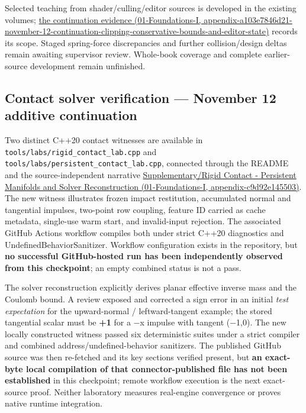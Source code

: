 Selected teaching from shader/culling/editor sources is developed in the existing volumes; \href{../01-Foundations-I/main.pdf\#nameddest=appendix-a103e7846d21-november-12-continuation-clipping-conservative-bounds-and-editor-state}{the continuation evidence (01-Foundations-I, appendix-a103e7846d21-november-12-continuation-clipping-conservative-bounds-and-editor-state)} records its scope. Staged spring-force discrepancies and further collision/design deltas remain awaiting supervisor review. Whole-book coverage and complete earlier-source development remain unfinished.

\subsection{Contact solver verification --- November 12 additive continuation}\label{appendix-3b67654799a2-contact-solver-verification-november-12-additive-continuation}

Two distinct C++20 contact witnesses are available in \texttt{tools/labs/rigid\_contact\_lab.cpp} and \texttt{tools/labs/persistent\_contact\_lab.cpp}, connected through the README and the source-independent narrative \href{../01-Foundations-I/main.pdf\#nameddest=appendix-c9d92e145503}{Supplementary/Rigid Contact - Persistent Manifolds and Solver Reconstruction (01-Foundations-I, appendix-c9d92e145503)}. The new witness illustrates frozen impact restitution, accumulated normal and tangential impulses, two-point row coupling, feature ID carried as cache metadata, single-use warm start, and invalid-input rejection. The associated GitHub Actions workflow compiles both under strict C++20 diagnostics and UndefinedBehaviorSanitizer. Workflow configuration exists in the repository, but \textbf{no successful GitHub-hosted run has been independently observed from this checkpoint}; an empty combined status is not a pass.

The solver reconstruction explicitly derives planar effective inverse mass and the Coulomb bound. A review exposed and corrected a sign error in an initial \emph{test expectation} for the upward-normal / leftward-tangent example; the stored tangential scalar must be \textbf{+1} for a −x impulse with tangent (−1,0). The new locally constructed witness passed six deterministic suites under a strict compiler and combined address/undefined-behavior sanitizers. The published GitHub source was then re-fetched and its key sections verified present, but \textbf{an exact-byte local compilation of that connector-published file has not been established} in this checkpoint; remote workflow execution is the next exact-source proof. Neither laboratory measures real-engine convergence or proves native runtime integration.

